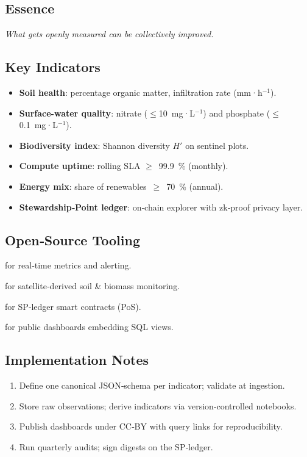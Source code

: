 \subsection*{Essence}
\emph{What gets openly measured can be collectively improved.}

\subsection*{Key Indicators}
\begin{itemize}
  \item \textbf{Soil health}: percentage organic matter, infiltration rate (mm·h$^{-1}$).
  \item \textbf{Surface-water quality}: nitrate ($\le$10 mg·L$^{-1}$) and phosphate ($\le$0.1 mg·L$^{-1}$).
  \item \textbf{Biodiversity index}: Shannon diversity $H'$ on sentinel plots.
  \item \textbf{Compute uptime}: rolling SLA $\ge$ 99.9 \% (monthly).
  \item \textbf{Energy mix}: share of renewables $\ge$ 70 \% (annual).
  \item \textbf{Stewardship‑Point ledger}: on‑chain explorer with zk‑proof privacy layer.
\end{itemize}

\subsection*{Open‑Source Tooling}
\begin{description}[style=nextline]
  \item[Grafana + Prometheus] for real‑time metrics and alerting.
  \item[OpenEO] for satellite‑derived soil & biomass monitoring.
  \item[Hyperledger Besu] for SP‑ledger smart contracts (PoS).
  \item[Superset] for public dashboards embedding SQL views.
\end{description}

\subsection*{Implementation Notes}
\begin{enumerate}
  \item Define one canonical JSON‑schema per indicator; validate at ingestion.
  \item Store raw observations; derive indicators via version‑controlled notebooks.
  \item Publish dashboards under CC‑BY with query links for reproducibility.
  \item Run quarterly audits; sign digests on the SP‑ledger.
\end{enumerate}

